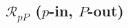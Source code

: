 \documentclass[aps,prb,10pt,showpacs,letterpaper,twocolumn]{revtex4-1}
\begin{document}



\subsection{\texorpdfstring{$\mathcal{R}_{pP}$ ($p$-in, $P$-out)}
{RpP (p-in, P-out)}}
\label{sec:RpP} 
\end{document}
